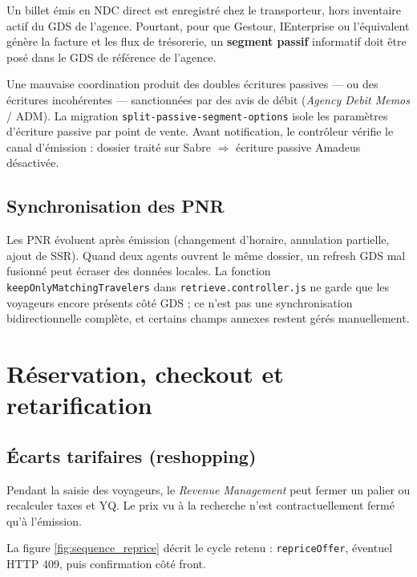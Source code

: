 Un billet émis en NDC direct est enregistré chez le transporteur, hors inventaire actif du GDS de l'agence. Pourtant, pour que Gestour, IEnterprise ou l'équivalent génère la facture et les flux de trésorerie, un \textbf{segment passif} informatif doit être posé dans le GDS de référence de l'agence.

Une mauvaise coordination produit des doubles écritures passives --- ou des écritures incohérentes --- sanctionnées par des avis de débit (\textit{Agency Debit Memos} / ADM). La migration \texttt{split-passive-segment-options} isole les paramètres d'écriture passive par point de vente. Avant notification, le contrôleur vérifie le canal d'émission : dossier traité sur Sabre $\Rightarrow$ écriture passive Amadeus désactivée.

\section{Synchronisation des PNR}

Les PNR évoluent après émission (changement d'horaire, annulation partielle, ajout de SSR). Quand deux agents ouvrent le même dossier, un refresh GDS mal fusionné peut écraser des données locales. La fonction \texttt{keepOnlyMatchingTravelers} dans \texttt{retrieve.controller.js} ne garde que les voyageurs encore présents côté GDS ; ce n'est pas une synchronisation bidirectionnelle complète, et certains champs annexes restent gérés manuellement.

\chapter{Réservation, checkout et retarification}
\label{chap:booking_reshop}

\section{Écarts tarifaires (reshopping)}

Pendant la saisie des voyageurs, le \textit{Revenue Management} peut fermer un palier ou recalculer taxes et YQ. Le prix vu à la recherche n'est contractuellement fermé qu'à l'émission.

La figure \ref{fig:sequence_reprice} décrit le cycle retenu : \texttt{repriceOffer}, éventuel HTTP 409, puis confirmation côté front.

